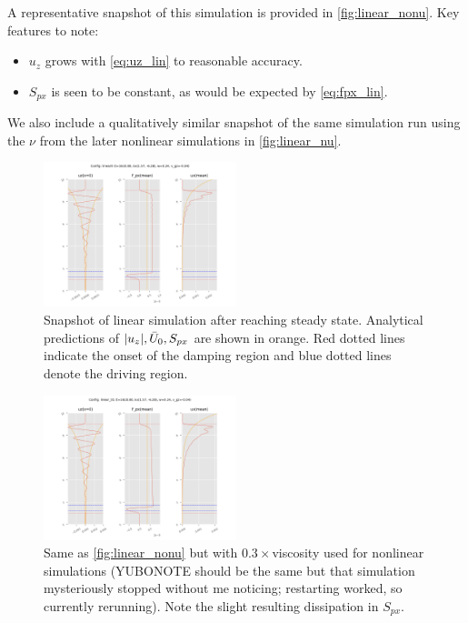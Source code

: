 \documentclass[twocolumn,
        nofootinbib, %
        usenames, %
        aps,
        prd,
        dvipsnames %
    ]{revtex4-1}%
\DeclarePairedDelimiter\abs{\lvert}{\rvert}
\begin{document}
A representative snapshot of this simulation
is provided in \autoref{fig:linear_nonu}. Key features to note:
\begin{itemize}
    \item $u_z$ grows with \autoref{eq:uz_lin} to reasonable accuracy.

    \item $S_{px}$ is seen to be constant, as would be expected by
        \autoref{eq:fpx_lin}.
\end{itemize}
We also include a qualitatively similar snapshot of the same simulation run
using the $\nu$ from the later nonlinear simulations in \autoref{fig:linear_nu}.
\begin{figure}[t]
    \centering
    \includegraphics[width=0.5\textwidth]{plots/linear_nonu.png}
    \caption{Snapshot of linear simulation after reaching steady state.
        Analytical predictions of $\abs*{u_z}, \bar{U}_0, S_{px}$ are shown in
        orange. Red dotted lines indicate the onset of the damping region and
        blue dotted lines denote the driving region.}\label{fig:linear_nonu}
\end{figure}
\begin{figure}[t]
    \centering
    \includegraphics[width=0.5\textwidth]{plots/linear_nu.png}
    \caption{Same as \autoref{fig:linear_nonu} but with $0.3\times $viscosity
    used for nonlinear simulations (YUBONOTE should be the same but that
    simulation mysteriously stopped without me noticing; restarting worked, so
    currently rerunning). Note the slight resulting dissipation in $S_{px}$.
    }\label{fig:linear_nu}
\end{figure}
\end{document}
